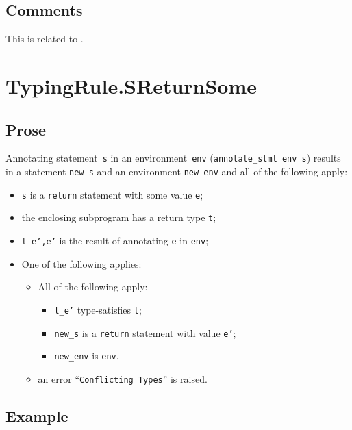 \documentclass{book}
\begin{document}
\begin{itemize}
\subsection{Comments}
    This is related to .

\section{TypingRule.SReturnSome \label{sec:TypingRule.SReturnSome}}

  \subsection{Prose}
Annotating statement~\texttt{s} in an environment~\texttt{env}
(\texttt{annotate\_stmt env s}) results in a statement \texttt{new\_s} and an
environment \texttt{new\_env} and all of the following apply:
   \begin{itemize}
   \item \texttt{s} is a \texttt{return} statement with some value \texttt{e};
   \item the enclosing subprogram has a return type \texttt{t};
   \item \texttt{t\_e',e'} is the result of annotating \texttt{e} in \texttt{env};
   \item One of the following applies:
     \begin{itemize}
     \item All of the following apply:
       \begin{itemize}
       \item \texttt{t\_e'} type-satisfies \texttt{t};
       \item \texttt{new\_s} is a \texttt{return} statement with value \texttt{e'};
       \item \texttt{new\_env} is \texttt{env}.
       \end{itemize}
     \item an error ``\texttt{Conflicting Types}'' is raised.
     \end{itemize}
   \end{itemize}

  \subsection{Example}



\begin{emptyformal}

\end{emptyformal}
\end{itemize}
\end{document}
